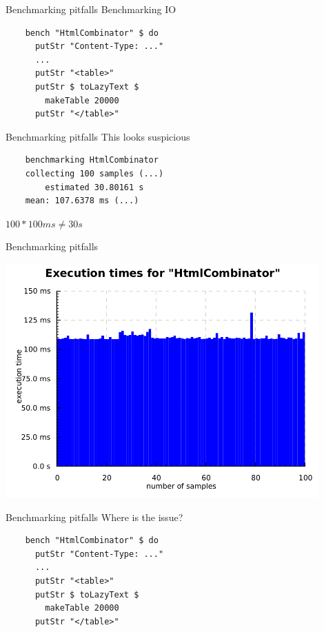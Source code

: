 \documentclass[20pt]{beamer}
\newcommand{\vspaced}{
    \vspace{5mm}
}
\begin{document}
\begin{frame}[fragile]{Benchmarking pitfalls}
    Benchmarking IO \\
    \vspaced
    \begin{lstlisting}
    bench "HtmlCombinator" $ do
      putStr "Content-Type: ..."
      ...
      putStr "<table>"
      putStr $ toLazyText $
        makeTable 20000
      putStr "</table>"
    \end{lstlisting}
\end{frame}

\begin{frame}[fragile]{Benchmarking pitfalls}
    This looks suspicious \\
    \vspaced
    \begin{lstlisting}
    benchmarking HtmlCombinator
    collecting 100 samples (...)
        estimated 30.80161 s
    mean: 107.6378 ms (...)
    \end{lstlisting}
    \vspaced
    $100 * 100ms \neq 30s$
\end{frame}

\begin{frame}{Benchmarking pitfalls}
    \begin{center}
    \includegraphics[width=0.9\textwidth]{images/htmlcombinator.pdf}
    \end{center}
\end{frame}

\begin{frame}[fragile]{Benchmarking pitfalls}
    Where is the issue? \\
    \vspaced
    \begin{lstlisting}
    bench "HtmlCombinator" $ do
      putStr "Content-Type: ..."
      ...
      putStr "<table>"
      putStr $ toLazyText $
        makeTable 20000
      putStr "</table>"
    \end{lstlisting}
\end{frame}
\end{document}
